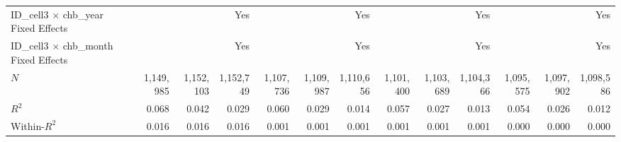 \begin{tabular}{lrrrrrrrrrrrr}
ID\_cell3 $\times$ chb\_year Fixed Effects  &              &              &          Yes &              &              &          Yes &              &              &          Yes &              &              &          Yes \\ 
ID\_cell3 $\times$ chb\_month Fixed Effects &              &              &          Yes &              &              &          Yes &              &              &          Yes &              &              &          Yes \\ 
\midrule
$N$                                         &    1,149,985 &    1,152,103 &    1,152,749 &    1,107,736 &    1,109,987 &    1,110,656 &    1,101,400 &    1,103,689 &    1,104,366 &    1,095,575 &    1,097,902 &    1,098,586 \\ 
$R^2$                                       &        0.068 &        0.042 &        0.029 &        0.060 &        0.029 &        0.014 &        0.057 &        0.027 &        0.013 &        0.054 &        0.026 &        0.012 \\ 
Within-$R^2$                                &        0.016 &        0.016 &        0.016 &        0.001 &        0.001 &        0.001 &        0.001 &        0.001 &        0.001 &        0.000 &        0.000 &        0.000 \\ 
\bottomrule
\end{tabular}
